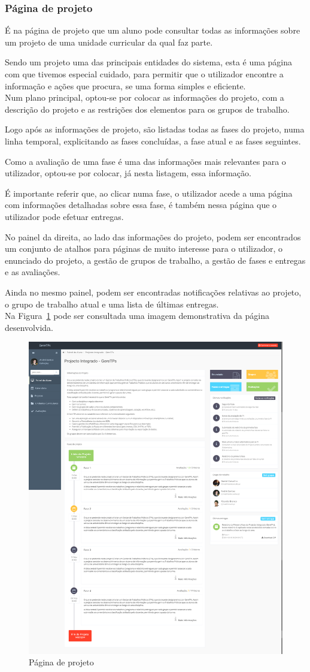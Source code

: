 \subsubsection{Página de projeto}
\label{ssub:student_project}

É na página de projeto que um aluno pode consultar todas as informações sobre um projeto de uma unidade curricular da qual faz parte.

Sendo um projeto uma das principais entidades do sistema, esta é uma página com que tivemos especial cuidado, para permitir que o utilizador encontre a informação e ações que procura, se uma forma simples e eficiente.\\

Num plano principal, optou-se por colocar as informações do projeto, com a descrição do projeto e as restrições dos elementos para os grupos de trabalho.

Logo após as informações de projeto, são listadas todas as fases do projeto, numa  linha temporal, explicitando as fases concluídas, a fase atual e as fases seguintes.

Como a avaliação de uma fase é uma das informações mais relevantes para o utilizador, optou-se por colocar, já nesta listagem, essa informação.

É importante referir que, ao clicar numa fase, o utilizador acede a uma página com informações detalhadas sobre essa fase, é também nessa página que o utilizador pode efetuar entregas.

No painel da direita, ao lado das informações do projeto, podem ser encontrados um conjunto de atalhos para páginas de muito interesse para o utilizador, o enunciado do projeto, a gestão de grupos de trabalho, a gestão de fases e entregas e as avaliações.

Ainda no mesmo painel, podem ser encontradas notificações relativas ao projeto, o grupo de trabalho atual e uma lista de últimas entregas.\\

Na Figura~\ref{fig:student_project} pode ser consultada uma imagem demonstrativa da página desenvolvida.

\begin{figure}[H]
  \centering
  \includegraphics[width=.8\textwidth,center]{images/implementacao/alunos/project}
  \caption{Página de projeto}
  \label{fig:student_project}
\end{figure}
